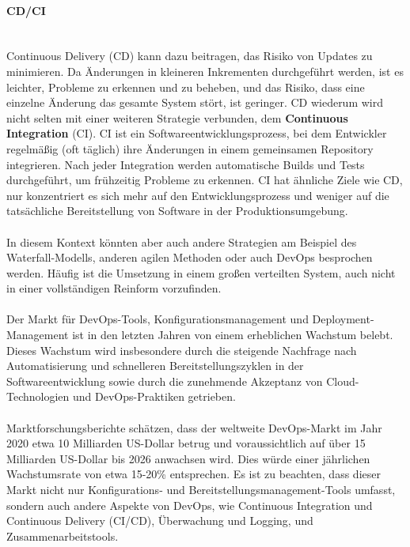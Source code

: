 \paragraph{CD/CI\\\\}
Continuous Delivery (CD) kann dazu beitragen, das Risiko von Updates zu minimieren. Da Änderungen in kleineren Inkrementen durchgeführt werden, ist es leichter, Probleme zu erkennen und zu beheben, und das Risiko, dass eine einzelne Änderung das gesamte System stört, ist geringer. CD wiederum  wird nicht selten mit einer weiteren Strategie verbunden, dem \textbf{Continuous Integration} (CI). CI ist ein Softwareentwicklungsprozess, bei dem Entwickler regelmäßig (oft täglich) ihre Änderungen in einem gemeinsamen Repository integrieren. Nach jeder Integration werden automatische Builds und Tests durchgeführt, um frühzeitig Probleme zu erkennen. CI hat ähnliche Ziele wie CD, nur konzentriert es sich mehr auf den Entwicklungsprozess und weniger auf die tatsächliche Bereitstellung von Software in der Produktionsumgebung. 
\\\\ 
In diesem Kontext könnten aber auch andere Strategien am Beispiel des Waterfall-Modells, anderen agilen Methoden oder auch DevOps besprochen werden. Häufig ist die Umsetzung in einem großen verteilten System, auch nicht in einer vollständigen Reinform vorzufinden.
\\\\
Der Markt für DevOps-Tools, Konfigurationsmanagement und Deployment-Management ist in den letzten Jahren von einem erheblichen Wachstum belebt. Dieses Wachstum wird insbesondere durch die steigende Nachfrage nach Automatisierung und schnelleren Bereitstellungszyklen in der Softwareentwicklung sowie durch die zunehmende Akzeptanz von Cloud-Technologien und DevOps-Praktiken getrieben.
\\\\
Marktforschungsberichte schätzen, dass der weltweite DevOps-Markt im Jahr 2020 etwa 10 Milliarden US-Dollar betrug und voraussichtlich auf über 15 Milliarden US-Dollar bis 2026 anwachsen wird. Dies würde einer jährlichen Wachstumsrate von etwa 15-20\% entsprechen. Es ist zu beachten, dass dieser Markt nicht nur Konfigurations- und Bereitstellungsmanagement-Tools umfasst, sondern auch andere Aspekte von DevOps, wie Continuous Integration und Continuous Delivery (CI/CD), Überwachung und Logging, und Zusammenarbeitstools.
\\\\
